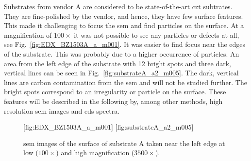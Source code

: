 Substrates from vendor A are considered to be state-of-the-art \ac{czt} subtrates. They are fine-polished by the vendor, and hence, they have few surface features. This made it challenging to focus the \ac{sem} and find particles on the surface. At a magnification of $100\times$ it was not possible to see any particles or defects at all, see Fig.~\ref{fig:EDX_BZ1503A_a_m001}. It was easier to find focus near the edges of the substrate. This was probably due to a higher occurrence of particles. An area from the left edge of the substrate with 12 bright spots and three dark, vertical lines can be seen in Fig.~\ref{fig:substrateA_a2_m005}. The dark, vertical lines are carbon contamination from the \ac{sem} and will not be studied further. The bright spots correspond to an irregularity or particle on the surface. These features will be described in the following by, among other methods, high resolution \ac{sem} images and \ac{eds} spectra.

\begin{figure}[htbp]
    \centering
    [fig:EDX_BZ1503A_a_m001]
    \hfill
    [fig:substrateA_a2_m005]
    \caption[\Ac{sem} images of substrate A.]{\Ac{sem} images of the surface of substrate A taken near the left edge at  low ($100\times$) and  high magnification ($3500\times$).}
    \label{fig:subA_overview}
\end{figure}

